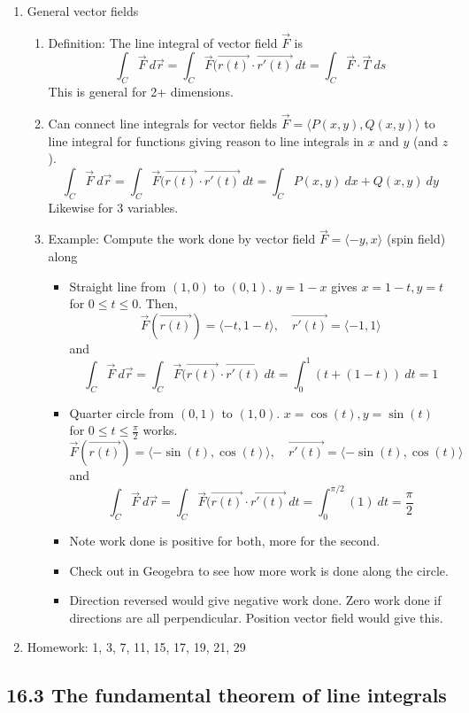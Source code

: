 \documentclass{article}
\begin{document}
\begin{enumerate}
\item General vector fields
\begin{enumerate}
\item Definition: The line integral of vector field $\vec{F}$ is 
\[
\int_C \vec{F} ~d\vec{r} = \int_C \vec{F}(\vec{r(t)} \cdot \vec{r'(t)} ~dt = \int_C \vec{F} \cdot \vec{T} ~ds 
\]
This is general for 2+ dimensions.
\item Can connect line integrals for vector fields $\vec{F} = \langle P(x,y), Q(x,y) \rangle$ to line integral for functions giving reason to line integrals in $x$ and $y$ (and $z$).
\[
\int_C \vec{F} ~d\vec{r} = \int_C \vec{F}(\vec{r(t)} \cdot \vec{r'(t)} ~dt =\int_C P(x,y) ~dx + Q(x,y) ~dy
\]
Likewise for 3 variables.
\item Example: Compute the work done by vector field $\vec{F} = \langle -y,x \rangle$ (spin field) along
\begin{itemize}
\item Straight line from $(1,0)$ to $(0,1)$. $y=1-x$ gives $x=1-t, y=t$ for $0 \leq t \leq 0$. Then,
\[
\vec{F}(\vec{r(t)}) = \langle -t, 1-t \rangle, \quad \vec{r'(t)} = \langle -1, 1 \rangle
\]
and
\[
\int_C \vec{F} ~d\vec{r} = \int_C \vec{F}(\vec{r(t)} \cdot \vec{r'(t)} ~dt = \int_0^1 \left(t+(1-t) \right) ~dt = 1
\]
\item Quarter circle from $(0,1)$ to $(1,0)$. $x=\cos(t), y=\sin(t)$ for $0 \leq t \leq \frac{\pi}{2}$ works.
\[
\vec{F}(\vec{r(t)}) = \langle -\sin(t),\cos(t) \rangle, \quad \vec{r'(t)} = \langle -\sin(t), \cos(t) \rangle
\]
and
\[
\int_C \vec{F} ~d\vec{r} = \int_C \vec{F}(\vec{r(t)} \cdot \vec{r'(t)} ~dt = \int_0^{\pi/2} \left(1 \right) ~dt = \frac{\pi}{2}
\]
\item Note work done is positive for both, more for the second.
\item Check out in Geogebra to see how more work is done along the circle. 
\item Direction reversed would give negative work done. Zero work done if directions are all perpendicular. Position vector field would give this.
\end{itemize}
\end{enumerate}

\item Homework: 1, 3, 7, 11, 15, 17, 19, 21, 29

\end{enumerate}

\subsection{16.3 The fundamental theorem of line integrals}
\end{document}
